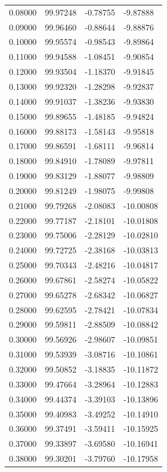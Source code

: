 \begin{table}
\begin{tabular}{llll}
0.08000 & 99.97248 & -0.78755 & -9.87888 \\
0.09000 & 99.96460 & -0.88644 & -9.88876 \\
0.10000 & 99.95574 & -0.98543 & -9.89864 \\
0.11000 & 99.94588 & -1.08451 & -9.90854 \\
0.12000 & 99.93504 & -1.18370 & -9.91845 \\
0.13000 & 99.92320 & -1.28298 & -9.92837 \\
0.14000 & 99.91037 & -1.38236 & -9.93830 \\
0.15000 & 99.89655 & -1.48185 & -9.94824 \\
0.16000 & 99.88173 & -1.58143 & -9.95818 \\
0.17000 & 99.86591 & -1.68111 & -9.96814 \\
0.18000 & 99.84910 & -1.78089 & -9.97811 \\
0.19000 & 99.83129 & -1.88077 & -9.98809 \\
0.20000 & 99.81249 & -1.98075 & -9.99808 \\
0.21000 & 99.79268 & -2.08083 & -10.00808 \\
0.22000 & 99.77187 & -2.18101 & -10.01808 \\
0.23000 & 99.75006 & -2.28129 & -10.02810 \\
0.24000 & 99.72725 & -2.38168 & -10.03813 \\
0.25000 & 99.70343 & -2.48216 & -10.04817 \\
0.26000 & 99.67861 & -2.58274 & -10.05822 \\
0.27000 & 99.65278 & -2.68342 & -10.06827 \\
0.28000 & 99.62595 & -2.78421 & -10.07834 \\
0.29000 & 99.59811 & -2.88509 & -10.08842 \\
0.30000 & 99.56926 & -2.98607 & -10.09851 \\
0.31000 & 99.53939 & -3.08716 & -10.10861 \\
0.32000 & 99.50852 & -3.18835 & -10.11872 \\
0.33000 & 99.47664 & -3.28964 & -10.12883 \\
0.34000 & 99.44374 & -3.39103 & -10.13896 \\
0.35000 & 99.40983 & -3.49252 & -10.14910 \\
0.36000 & 99.37491 & -3.59411 & -10.15925 \\
0.37000 & 99.33897 & -3.69580 & -10.16941 \\
0.38000 & 99.30201 & -3.79760 & -10.17958 \\

\end{tabular}
\end{table}
